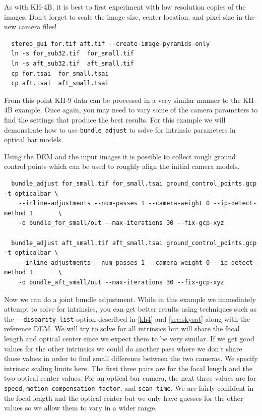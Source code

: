 As with KH-4B, it is best to first experiment with low resolution copies of the images.
Don't forget to scale the image size, center location, and pixel size in the new camera files!

\begin{verbatim}
  stereo_gui for.tif aft.tif --create-image-pyramids-only
  ln -s for_sub32.tif  for_small.tif
  ln -s aft_sub32.tif  aft_small.tif
  cp for.tsai  for_small.tsai
  cp aft.tsai  aft_small.tsai
\end{verbatim}

From this point KH-9 data can be processed in a very similar manner to the KH-4B example.
Once again, you may need to vary some of the camera parameters to find the settings that
produce the best results.  For this example we will demonstrate how to use 
\texttt{bundle\_adjust} to solve for intrinsic parameters in optical bar models.

Using the DEM and the input images it is possible to collect rough ground control points
which can be used to roughly align the initial camera models.

\begin{verbatim}
  bundle_adjust for_small.tif for_small.tsai ground_control_points.gcp -t opticalbar \
    --inline-adjustments --num-passes 1 --camera-weight 0 --ip-detect-method 1       \
    -o bundle_for_small/out --max-iterations 30 --fix-gcp-xyz

  bundle_adjust aft_small.tif aft_small.tsai ground_control_points.gcp -t opticalbar \
    --inline-adjustments --num-passes 1 --camera-weight 0 --ip-detect-method 1       \
    -o bundle_aft_small/out --max-iterations 30 --fix-gcp-xyz
\end{verbatim}

Now we can do a joint bundle adjustment.  While in this example we immediately attempt
to solve for intrinsics, you can get better results using techniques such as the
\texttt{-\/-disparity-list} option described in \ref{kh4} and \ref{sec:skysat} along with
the reference DEM.  We will try to solve for all intrinsics but will share the
focal length and optical center since we expect them to be very similar.  If we get
good values for the other intrinsics we could do another pass where we don't share
those values in order to find small difference between the two cameras.  We specify
intrinsic scaling limits here.  The first three pairs are for the focal length and
the two optical center values.  For an optical bar camera, the next three values are
for \texttt{speed}, \texttt{motion\_compensation\_factor}, and \texttt{scan\_time}.
We are fairly confident in the focal length and the optical center but we only have
guesses for the other values so we allow them to vary in a wider range.

